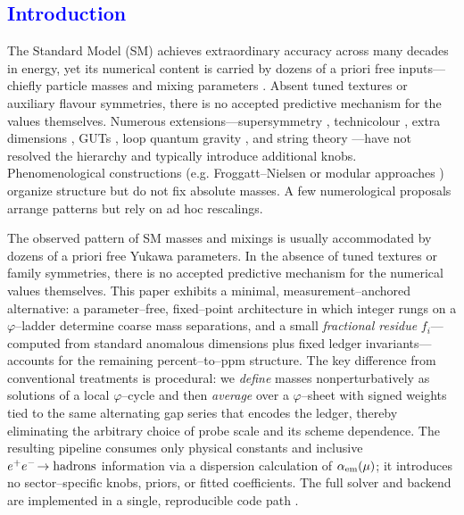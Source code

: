 \documentclass[%
 amsmath,amssymb,
 aps,
prb,
floatfix, showkeys
]{revtex4-2}
\newcommand{\modif}[1]{\textcolor{blue}{#1}}
\begin{document}
\modif{
  \section{ Introduction}
\label{sec-1}
}
The Standard Model (SM) \cite{SM-ref,weinberg-book,Weinberg1979} achieves extraordinary accuracy across many decades in energy, yet its numerical content is carried by dozens of a priori free inputs—chiefly particle masses and mixing parameters \cite{PDG2022,PDG2025}. Absent tuned textures or auxiliary flavour symmetries, there is no accepted predictive mechanism for the values themselves. Numerous extensions—supersymmetry \cite{dine-1993,Wess1974}, technicolour \cite{Susskind1979,hill-2003,technicolor-2015}, extra dimensions \cite{Randall1999}, GUTs \cite{grand-uni-th-2015}, loop quantum gravity \cite{Rovelli2004,loop-qg}, and string theory \cite{polchinski-1998}—have not resolved the hierarchy and typically introduce additional knobs. Phenomenological constructions (e.g. Froggatt–Nielsen \cite{frog-1979,fritz-2000} or modular approaches \cite{petcov}) organize structure but do not fix absolute masses. A few numerological proposals \cite{koide-1983,eln-2002,eln-2002-1,cascade-2003} arrange patterns but rely on ad hoc rescalings.


The observed pattern of SM masses and mixings is usually accommodated by dozens of a priori free Yukawa parameters. In the absence of tuned textures or family symmetries, there is no accepted predictive mechanism for the numerical values themselves.
This paper exhibits a minimal, measurement--anchored alternative: a parameter--free, fixed--point architecture in which integer rungs on a $\varphi$--ladder determine coarse mass separations, and a small \emph{fractional residue} $f_i$—computed from standard anomalous dimensions plus fixed ledger invariants—accounts for the remaining percent--to--ppm structure. The key difference from conventional treatments is procedural: we \emph{define} masses nonperturbatively as solutions of a local $\varphi$--cycle and then \emph{average} over a $\varphi$--sheet with signed weights tied to the same alternating gap series that encodes the ledger, thereby eliminating the arbitrary choice of probe scale and its scheme dependence. The resulting pipeline consumes only physical constants and inclusive $e^+e^-\!\to{\rm hadrons}$ information via a dispersion calculation of $\alpha_{\rm em}(\mu)$; it introduces no sector--specific knobs, priors, or fitted coefficients. The full solver and backend are implemented in a single, reproducible code path \cite{EidelmanJegerlehner1995,Jegerlehner2003,Keshavarzi2019,Davier2017,PDG2024}.
\end{document}
